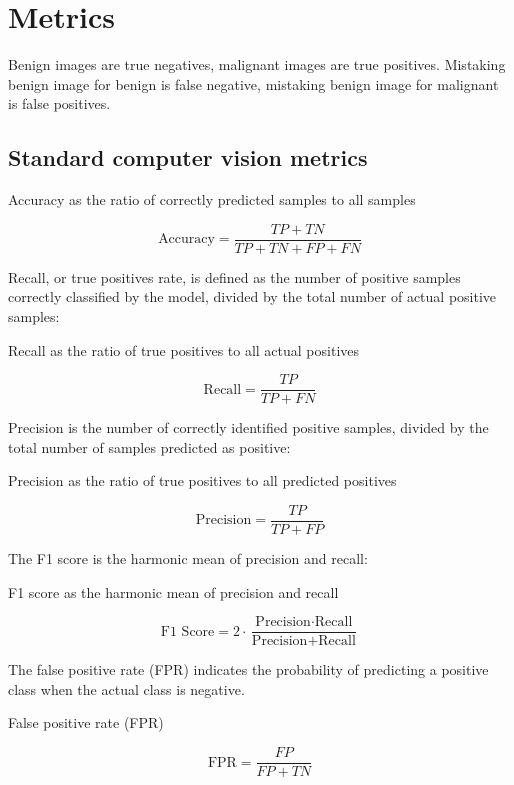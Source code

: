 \section{Metrics}

Benign images are true negatives, malignant images are true positives. Mistaking benign image for benign is false negative, mistaking benign image for malignant is false positives.

\subsection{Standard computer vision metrics}

\begin{myequation}[H]
\caption{Accuracy as the ratio of correctly predicted samples to all samples}
\label{eq:accuracy}
\[
\text{Accuracy} = \frac{TP + TN}{TP + TN + FP + FN}
\]
\end{myequation}


Recall, or true positives rate, is defined as the number of positive samples correctly classified by the model, divided by the total number of actual positive samples:

\begin{myequation}[H]
\caption{Recall as the ratio of true positives to all actual positives}
\label{eq:recall}
\[
\text{Recall} = \frac{TP}{TP + FN}
\]
\end{myequation}

Precision is the number of correctly identified positive samples, divided by the total number of samples predicted as positive:

\begin{myequation}[H]
\caption{Precision as the ratio of true positives to all predicted positives}
\label{eq:precision}
\[
\text{Precision} = \frac{TP}{TP + FP}
\]
\end{myequation}


The F1 score is the harmonic mean of precision and recall:

\begin{myequation}[H]
\caption{F1 score as the harmonic mean of precision and recall}
\label{eq:f1}
\[
\text{F1 Score} = 2 \cdot \frac{\text{Precision} \cdot \text{Recall}}{\text{Precision} + \text{Recall}}
\]
\end{myequation}


The false positive rate (FPR) indicates the probability of predicting a positive class when the actual class is negative.

\begin{myequation}[h!]
\caption{False positive rate (FPR)}
\label{eq:fpr}
\[
\text{FPR} = \frac{FP}{FP + TN}
\]
\end{myequation}

